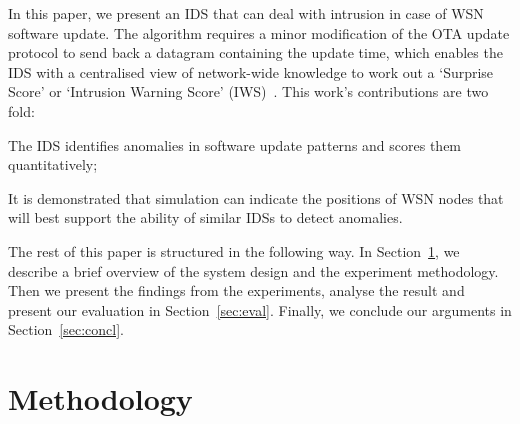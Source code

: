 \documentclass[conference]{IEEEtran}
\begin{document}
In this paper, we present an IDS that can deal with intrusion in case of WSN software update.
The algorithm requires a minor modification of the OTA update protocol to send back a datagram containing the update time, 
which enables the IDS with a centralised view of network-wide knowledge to work out a  `Surprise Score' or `Intrusion Warning Score' (IWS)~\cite{aalam15}.
This work's contributions are two fold: 
\begin{inparaenum}
\item  The IDS identifies anomalies in software update patterns and scores them quantitatively;
\item It is demonstrated that simulation can indicate the positions of WSN nodes that will best support the ability of similar IDSs to detect anomalies.
\end{inparaenum}
The rest of this paper is structured in the following way. 
In Section~\ref{sec:meth}, we describe a brief overview of the system  design and the experiment methodology. 
Then we  present the findings from the experiments, analyse the result and present our evaluation in Section~\ref{sec:eval}.  
Finally, we conclude our arguments in Section~\ref{sec:concl}.


\section{Methodology}
\label{sec:meth}

\end{document}
